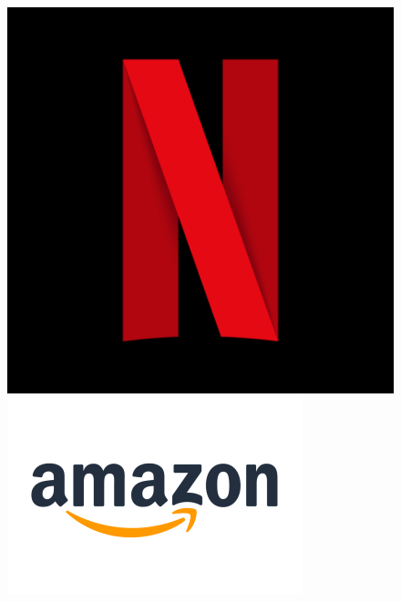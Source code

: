 \begin{figure}[h!]
    \centering
    \begin{minipage}{0.2\textwidth}
        \centering
        \includegraphics[width=\textwidth]{images/netflix.png}
    \end{minipage}\hfill
    \begin{minipage}{0.2\textwidth}
        \centering
        \includegraphics[width=\textwidth]{images/amazon.png}
    \end{minipage}\hfill
    \begin{minipage}{0.2\textwidth}

\end{minipage}
\end{figure}
